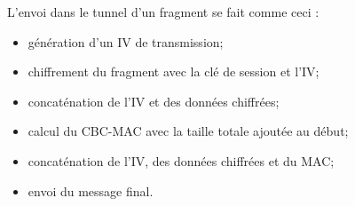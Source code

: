 \documentclass[a4paper,11pt,french]{article}
\begin{document}
L'envoi dans le tunnel d'un fragment se fait comme ceci : 
\begin{itemize}
    \item génération d'un IV de transmission;
    \item chiffrement du fragment avec la clé de session et l'IV;
    \item concaténation de l'IV et des données chiffrées;
    \item calcul du CBC-MAC avec la taille totale ajoutée au début;
    \item concaténation de l'IV, des données chiffrées et du MAC;
    \item envoi du message final.
\end{itemize} 
\end{document}
